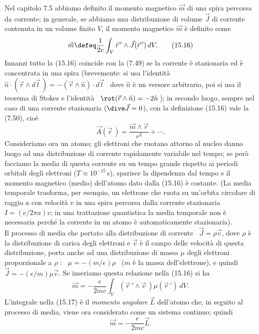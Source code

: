 Nel capitolo 7.5 abbiamo definito il momento magnetico $\vec m$ di una spira
percorsa da corrente; in generale, se abbiamo una distribuzione di volume
$\vec J$ di corrente contenuta in un volume finito $V$, il momento magnetico
$\vec m$ \`e definito come
\begin{equation}
  \vec m\defeq\frac{1}{2c}\int_V\vec r\,'\wedge\vec J(\vec r\,')\,dV.
  \tag{15.16}
\end{equation}
Innanzi tutto la (15.16) coincide con la (7.49) se la corrente \`e stazionaria
ed \`e concentrata in una spira \big(brevemente: si usa l'identit\`a
\ $\hat n\cdot(\vec r\wedge d\vec l\,)=-(\vec r\wedge\hat n)\cdot d\vec l$
\ dove $\hat n$ \`e un versore arbitrario, poi si usa il teorema di Stokes e
l'identit\`a \ $\rot(\vec r\wedge\hat n)=-2\hat n$\,\big); in secondo luogo,
sempre nel caso di una corrente stazionaria ($\dive\vec J=0$), con la
definizione (15.16) vale la (7.50), cio\`e
\[
  \vec A(\vec r\,)=\frac{\vec m\wedge\vec r}{r^3}+\cdots.
\]
Consideriamo ora un atomo; gli elettroni che ruotano attorno al nucleo danno
luogo ad una distribuzione di corrente rapidamente variabile nel tempo; se
per\`o facciamo la media di questa corrente su un tempo grande rispetto ai
periodi orbitali degli elettroni ($T\approx10^{-15}$\,s), sparisce la dipendenza
dal tempo e il momento magnetico (medio) dell'atomo dato dalla (15.16) \`e
costante. (La media temporale trasforma, per esempio, un elettrone che ruota su
un'orbita circolare di raggio $a$ con velocit\`a $v$ in una spira percorsa dalla
corrente stazionaria $I=(e/2\pi a)v$; in una trattazione quantistica la media
temporale non \`e necessaria perch\'e la corrente in un atomo \`e
automaticamente stazionaria).\\
Il processo di media che portato alla distribuzione di corrente
\ $\vec J=\rho\vec v$, dove $\rho$ \`e la distribuzione di carica degli
elettroni e $\vec v$ \`e il campo delle velocit\`a di questa distribuzione,
porta anche ad una distribuzione di massa $\mu$ degli elettroni proporzionale a
$\rho$ : \ $\mu=-(m/e)\rho$ \ ($m$ \`e la massa dell'elettrone), e quindi
\ $\vec J=-(e/m)\mu\vec v$. Se inseriamo questa relazione nella (15.16) si ha
\begin{equation}
  \vec m=-\frac{e}{2mc}\int_V(\vec r\,'\wedge\vec v\,)\mu(\vec r\,')\,dV.
  \tag{15.17}
\end{equation}
L'integrale nella (15.17) \`e il \textit{momento angolare} $\vec L$ dell'atomo
che, in seguito al processo di media, viene ora considerato come un sistema
continuo; quindi
\begin{equation}
  \vec m=-\frac{e}{2mc}\vec L.
  \tag{15.18}
\end{equation}
